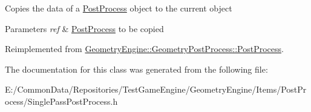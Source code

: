 Copies the data of a \mbox{\hyperlink{class_geometry_engine_1_1_geometry_post_process_1_1_post_process}{Post\+Process}} object to the current object 
\begin{DoxyParams}{Parameters}
{\em ref} & \mbox{\hyperlink{class_geometry_engine_1_1_geometry_post_process_1_1_post_process}{Post\+Process}} to be copied \\
\hline
\end{DoxyParams}


Reimplemented from \mbox{\hyperlink{class_geometry_engine_1_1_geometry_post_process_1_1_post_process_aba093c175b228894204e785a5a54e6e9}{Geometry\+Engine\+::\+Geometry\+Post\+Process\+::\+Post\+Process}}.



The documentation for this class was generated from the following file\+:\begin{DoxyCompactItemize}
\item 
E\+:/\+Common\+Data/\+Repositories/\+Test\+Game\+Engine/\+Geometry\+Engine/\+Items/\+Post\+Process/Single\+Pass\+Post\+Process.\+h\end{DoxyCompactItemize}
